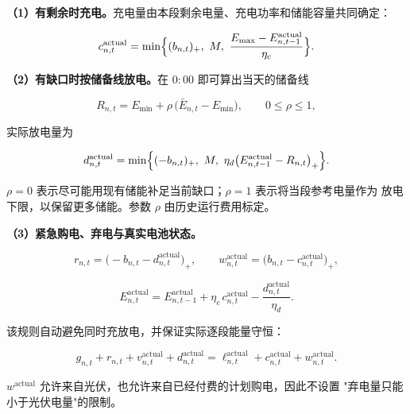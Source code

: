 \documentclass[withoutpreface,bwprint]{cumcmthesis}
\begin{document}
\textbf{（1）有剩余时充电。}充电量由本段剩余电量、充电功率和储能容量共同确定：

\begin{equation}
  c_{n,t}^{\mathrm{actual}}
  =\min\Bigl\{(b_{n,t})_+,\ M,\
  \frac{E_{\max}-E_{n,t-1}^{\mathrm{actual}}}{\eta_c}\Bigr\} .
  \label{eq:p2-charge}
\end{equation}

\textbf{（2）有缺口时按储备线放电。}在 $0{:}00$ 即可算出当天的储备线

\begin{equation}
  R_{n,t}=E_{\min}+\rho\,\bigl(\bar E_{n,t}-E_{\min}\bigr),\qquad 0\le\rho\le1 ,
  \label{eq:p2-reserve}
\end{equation}

实际放电量为

\begin{equation}
  d_{n,t}^{\mathrm{actual}}
  =\min\Bigl\{(-b_{n,t})_+,\ M,\
  \eta_d\bigl(E_{n,t-1}^{\mathrm{actual}}-R_{n,t}\bigr)_+\Bigr\} .
  \label{eq:p2-discharge}
\end{equation}

$\rho=0$ 表示尽可能用现有储能补足当前缺口；$\rho=1$ 表示将当段参考电量作为
放电下限，以保留更多储能。参数 $\rho$ 由历史运行费用标定。

\textbf{（3）紧急购电、弃电与真实电池状态。}

\begin{equation}
  r_{n,t}=\bigl(-b_{n,t}-d_{n,t}^{\mathrm{actual}}\bigr)_+,
  \qquad
  w_{n,t}^{\mathrm{actual}}=\bigl(b_{n,t}-c_{n,t}^{\mathrm{actual}}\bigr)_+ ,
  \label{eq:p2-residual}
\end{equation}

\begin{equation}
  E_{n,t}^{\mathrm{actual}}
  =E_{n,t-1}^{\mathrm{actual}}
  +\eta_c\,c_{n,t}^{\mathrm{actual}}
  -\frac{d_{n,t}^{\mathrm{actual}}}{\eta_d} .
  \label{eq:p2-state}
\end{equation}

该规则自动避免同时充放电，并保证实际逐段能量守恒：

\begin{equation}
  g_{n,t}+r_{n,t}+v_{n,t}^{\mathrm{actual}}+d_{n,t}^{\mathrm{actual}}
  =\ell_{n,t}^{\mathrm{actual}}+c_{n,t}^{\mathrm{actual}}
  +w_{n,t}^{\mathrm{actual}} .
  \label{eq:p2-actual-balance}
\end{equation}

$w^{\mathrm{actual}}$ 允许来自光伏，也允许来自已经付费的计划购电，因此不设置
"弃电量只能小于光伏电量"的限制。
\end{document}

